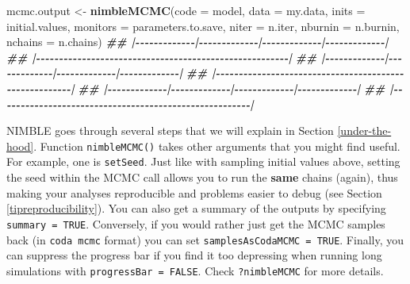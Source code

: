\documentclass[
  12pt,
]{krantz}
\newenvironment{Shaded}{\begin{snugshade}}{\end{snugshade}}
\newcommand{\AttributeTok}[1]{\textcolor[rgb]{0.13,0.29,0.53}{#1}}
\newcommand{\DocumentationTok}[1]{\textcolor[rgb]{0.56,0.35,0.01}{\textbf{\textit{#1}}}}
\newcommand{\FunctionTok}[1]{\textcolor[rgb]{0.13,0.29,0.53}{\textbf{#1}}}
\newcommand{\NormalTok}[1]{#1}
\newcommand{\OtherTok}[1]{\textcolor[rgb]{0.56,0.35,0.01}{#1}}
\begin{document}
\begin{Shaded}
\begin{Highlighting}[]
\NormalTok{mcmc.output }\OtherTok{\textless{}{-}} \FunctionTok{nimbleMCMC}\NormalTok{(}\AttributeTok{code =}\NormalTok{ model,}
                          \AttributeTok{data =}\NormalTok{ my.data,}
                          \AttributeTok{inits =}\NormalTok{ initial.values,}
                          \AttributeTok{monitors =}\NormalTok{ parameters.to.save,}
                          \AttributeTok{niter =}\NormalTok{ n.iter,}
                          \AttributeTok{nburnin =}\NormalTok{ n.burnin,}
                          \AttributeTok{nchains =}\NormalTok{ n.chains)}
\DocumentationTok{\#\# |{-}{-}{-}{-}{-}{-}{-}{-}{-}{-}{-}{-}{-}|{-}{-}{-}{-}{-}{-}{-}{-}{-}{-}{-}{-}{-}|{-}{-}{-}{-}{-}{-}{-}{-}{-}{-}{-}{-}{-}|{-}{-}{-}{-}{-}{-}{-}{-}{-}{-}{-}{-}{-}|}
\DocumentationTok{\#\# |{-}{-}{-}{-}{-}{-}{-}{-}{-}{-}{-}{-}{-}{-}{-}{-}{-}{-}{-}{-}{-}{-}{-}{-}{-}{-}{-}{-}{-}{-}{-}{-}{-}{-}{-}{-}{-}{-}{-}{-}{-}{-}{-}{-}{-}{-}{-}{-}{-}{-}{-}{-}{-}{-}{-}|}
\DocumentationTok{\#\# |{-}{-}{-}{-}{-}{-}{-}{-}{-}{-}{-}{-}{-}|{-}{-}{-}{-}{-}{-}{-}{-}{-}{-}{-}{-}{-}|{-}{-}{-}{-}{-}{-}{-}{-}{-}{-}{-}{-}{-}|{-}{-}{-}{-}{-}{-}{-}{-}{-}{-}{-}{-}{-}|}
\DocumentationTok{\#\# |{-}{-}{-}{-}{-}{-}{-}{-}{-}{-}{-}{-}{-}{-}{-}{-}{-}{-}{-}{-}{-}{-}{-}{-}{-}{-}{-}{-}{-}{-}{-}{-}{-}{-}{-}{-}{-}{-}{-}{-}{-}{-}{-}{-}{-}{-}{-}{-}{-}{-}{-}{-}{-}{-}{-}|}
\DocumentationTok{\#\# |{-}{-}{-}{-}{-}{-}{-}{-}{-}{-}{-}{-}{-}|{-}{-}{-}{-}{-}{-}{-}{-}{-}{-}{-}{-}{-}|{-}{-}{-}{-}{-}{-}{-}{-}{-}{-}{-}{-}{-}|{-}{-}{-}{-}{-}{-}{-}{-}{-}{-}{-}{-}{-}|}
\DocumentationTok{\#\# |{-}{-}{-}{-}{-}{-}{-}{-}{-}{-}{-}{-}{-}{-}{-}{-}{-}{-}{-}{-}{-}{-}{-}{-}{-}{-}{-}{-}{-}{-}{-}{-}{-}{-}{-}{-}{-}{-}{-}{-}{-}{-}{-}{-}{-}{-}{-}{-}{-}{-}{-}{-}{-}{-}{-}|}
\end{Highlighting}
\end{Shaded}

NIMBLE goes through several steps that we will explain in Section \ref{under-the-hood}. Function \texttt{nimbleMCMC()} takes other arguments that you might find useful. For example, one is \texttt{setSeed}. Just like with sampling initial values above, setting the seed within the MCMC call allows you to run the \textbf{same} chains (again), thus making your analyses reproducible and problems easier to debug (see Section \ref{tipreproducibility}). You can also get a summary of the outputs by specifying \texttt{summary\ =\ TRUE}. Conversely, if you would rather just get the MCMC samples back (in \texttt{coda\ mcmc} format) you can set \texttt{samplesAsCodaMCMC\ =\ TRUE}. Finally, you can suppress the progress bar if you find it too depressing when running long simulations with \texttt{progressBar\ =\ FALSE}. Check \texttt{?nimbleMCMC} for more details.
\end{document}
